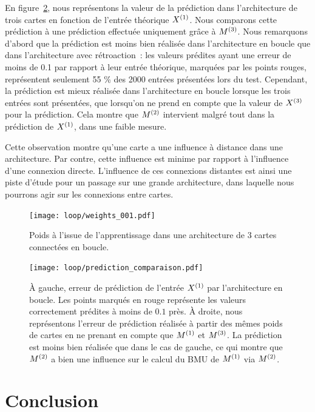 \documentclass[../main]{subfiles}
\begin{document}
En figure~\ref{fig:pred_loop}, nous représentons la valeur de la prédiction dans l'architecture de trois cartes en fonction de l'entrée théorique $X^{({1})}$. Nous comparons cette prédiction à une prédiction effectuée uniquement grâce à $M^{({3})}$.
Nous remarquons d'abord que la prédiction est moins bien réalisée dans l'architecture en boucle que dans l'architecture avec rétroaction~: les valeurs prédites ayant une erreur de moins de 0.1 par rapport à leur entrée théorique, marquées par les points rouges, représentent seulement 55 \% des 2000 entrées présentées lors du test.
Cependant, la prédiction est mieux réalisée dans l'architecture en boucle lorsque les trois entrées sont présentées, que lorsqu'on ne prend en compte que la valeur de $X^{({3})}$ pour la prédiction. Cela montre que $M^{({2})}$ intervient malgré tout dans la prédiction de $X^{({1})}$, dans une faible mesure.

Cette observation montre qu'une carte a une influence à distance dans une architecture. Par contre, cette influence est minime par rapport à l'influence d'une connexion directe.
L'influence de ces connexions distantes est ainsi une piste d'étude pour un passage sur une grande architecture, dans laquelle nous pourrons agir sur les connexions entre cartes.

\begin{figure}[h!]
		\centering\texttt{[image: loop/weights\_001.pdf]}
		\caption{Poids à l'issue de l'apprentissage dans une architecture de 3 cartes connectées en boucle.\label{fig:3som_loop}}
\end{figure}

\begin{figure}[h!]
	\centering\texttt{[image: loop/prediction\_comparaison.pdf]}
	\caption{\`A gauche, erreur de prédiction de l'entrée $X^{({1})}$ par l'architecture en boucle. Les points marqués en rouge représente les valeurs correctement prédites à moins de $0.1$ près. 
	\`A droite, nous représentons l'erreur de prédiction réalisée à partir des mêmes poids de cartes en ne prenant en compte que $M^{({1})}$ et $M^{({3})}$. La prédiction est moins bien réalisée que dans le cas de gauche, ce qui montre que $M^{({2})}$ a bien une influence sur le calcul du BMU de $M^{({1})}$ via $M^{({2})}$.
	\label{fig:pred_loop}}
\end{figure}

\section{Conclusion}
\end{document}
